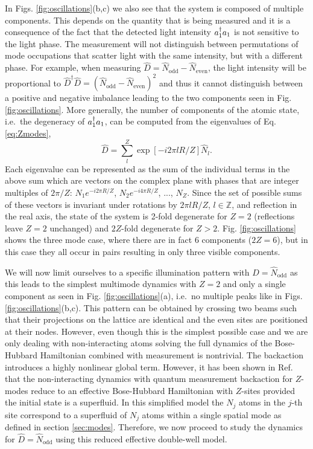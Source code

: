 In Figs. \ref{fig:oscillations}(b,c) we also see that the system is
composed of multiple components. This depends on the quantity that is
being measured and it is a consequence of the fact that the detected
light intensity $a^\dagger_1 a_1$ is not sensitive to the light phase. The
measurement will not distinguish between permutations of mode
occupations that scatter light with the same intensity, but with a
different phase. For example, when measuring
$\hat{D} = \hat{N}_\mathrm{odd} - \hat{N}_\mathrm{even}$, the light
intensity will be proportional to
$\hat{D}^\dagger \hat{D} = (\hat{N}_\mathrm{odd} -
\hat{N}_\mathrm{even})^2$ and thus it cannot distinguish between a
positive and negative imbalance leading to the two components seen in
Fig. \ref{fig:oscillations}. More generally, the number of components
of the atomic state, i.e.~the degeneracy of $a^\dagger_1 a_1$, can be
computed from the eigenvalues of Eq. \eqref{eq:Zmodes},
\begin{equation}
  \hat{D} = \sum_l^Z \exp\left[-i 2 \pi l R / Z \right] \hat{N}_l.
\end{equation}
Each eigenvalue can be represented as the sum of the individual terms
in the above sum which are vectors on the complex plane with phases
that are integer multiples of $2 \pi / Z$: $N_1 e^{-i 2 \pi R / Z}$,
$N_2 e^{-i 4 \pi R / Z}$, ..., $N_Z$. Since the set of possible sums
of these vectors is invariant under rotations by $2 \pi l R / Z$,
$l \in \mathbb{Z}$, and reflection in the real axis, the state of the
system is 2-fold degenerate for $Z = 2$ (reflections leave $Z = 2$
unchanged) and $2Z$-fold degenerate for $Z >
2$. Fig. \ref{fig:oscillations} shows the three mode case, where there
are in fact $6$ components ($2Z = 6$), but in this case they all occur
in pairs resulting in only three visible components.

We will now limit ourselves to a specific illumination pattern with
$\hat{D} = \hat{N}_\mathrm{odd}$ as this leads to the simplest
multimode dynamics with $Z = 2$ and only a single component as seen in
Fig. \ref{fig:oscillations}(a), i.e.~no multiple peaks like in
Figs. \ref{fig:oscillations}(b,c). This pattern can be obtained by
crossing two beams such that their projections on the lattice are
identical and the even sites are positioned at their nodes. However,
even though this is the simplest possible case and we are only dealing
with non-interacting atoms solving the full dynamics of the
Bose-Hubbard Hamiltonian combined with measurement is nontrivial. The
backaction introduces a highly nonlinear global term. However, it has
been shown in Ref. \cite{mazzucchi2016njp} that the non-interacting
dynamics with quantum measurement backaction for $Z$-modes reduce to
an effective Bose-Hubbard Hamiltonian with $Z$-sites provided the
initial state is a superfluid. In this simplified model the $N_j$
atoms in the $j$-th site correspond to a superfluid of $N_j$ atoms
within a single spatial mode as defined in section
\ref{sec:modes}. Therefore, we now proceed to study the dynamics for
$\hat{D} = \hat{N}_\mathrm{odd}$ using this reduced effective
double-well model.

